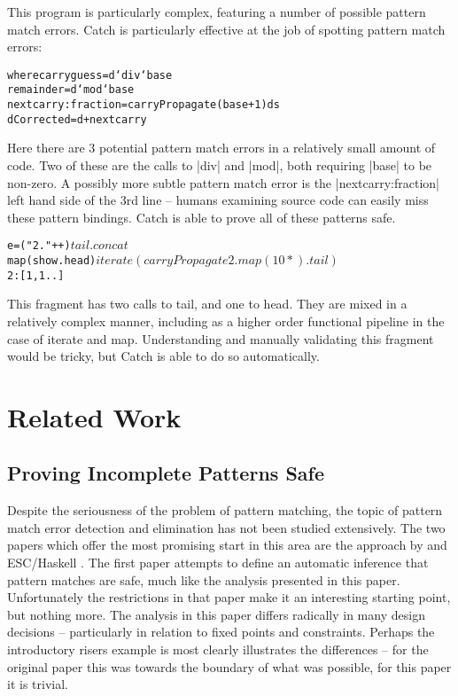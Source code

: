 \documentclass[preprint]{sigplanconf}
\newcommand{\C}[1]{\textsf{#1}}
\newenvironment{code}{\begin{alltt}\small}{\end{alltt}}
\begin{document}
This program is particularly complex, featuring a number of possible pattern match errors. Catch is particularly effective at the job of spotting pattern match errors:

\begin{code}
  where  carryguess = d `div` base
         remainder = d `mod` base
         nextcarry:fraction = carryPropagate (base+1) ds
         dCorrected = d + nextcarry
\end{code}

Here there are 3 potential pattern match errors in a relatively small amount of code. Two of these are the calls to |div| and |mod|, both requiring |base| to be non-zero. A possibly more subtle pattern match error is the |nextcarry:fraction| left hand side of the 3rd line -- humans examining source code can easily miss these pattern bindings. Catch is able to prove all of these patterns safe.

\begin{code}
e =  ("2."++) $
     tail . concat $
     map (show.head) $
     iterate (carryPropagate 2 . map (10*) . tail) $
     2:[1,1..]
\end{code}

This fragment has two calls to \C{tail}, and one to \C{head}. They are mixed in a relatively complex manner, including as a higher order functional pipeline in the case of \C{iterate} and \C{map}. Understanding and manually validating this fragment would be tricky, but Catch is able to do so automatically.


\section{Related Work}
\label{sec:related}

\subsection{Proving Incomplete Patterns Safe}

Despite the seriousness of the problem of pattern matching, the topic of pattern match error detection and elimination has not been studied extensively. The two papers which offer the most promising start in this area are the approach by \cite{me:catch_2005} and ESC/Haskell \citep{esc_haskell}. The first paper attempts to define an automatic inference that pattern matches are safe, much like the analysis presented in this paper. Unfortunately the restrictions in that paper make it an interesting starting point, but nothing more. The analysis in this paper differs radically in many design decisions -- particularly in relation to fixed points and constraints. Perhaps the introductory risers example is most clearly illustrates the differences -- for the original paper this was towards the boundary of what was possible, for this paper it is trivial.
\end{document}
